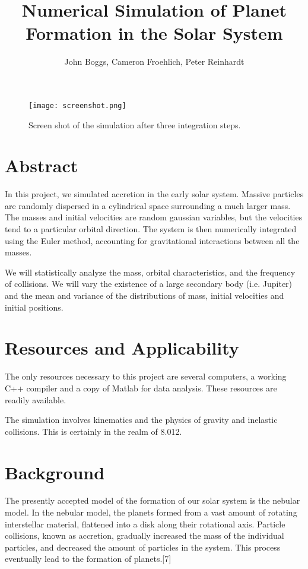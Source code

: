 \documentclass{article}
\begin{document}
\title{Numerical Simulation of Planet Formation in the Solar System}
\author{John Boggs, Cameron Froehlich, Peter Reinhardt}
\maketitle

\begin{figure} 
 \begin{center}
 \texttt{[image: screenshot.png]} 
 \caption{Screen shot of the simulation after three integration steps.} 
 \end{center}
\end{figure}

\section{Abstract}
In this project, we simulated accretion in the early solar system. Massive particles are randomly dispersed in a cylindrical space surrounding a much larger mass. The masses and initial velocities are random gaussian variables, but the velocities tend to a particular orbital direction. The system is then numerically integrated using the Euler method, accounting for gravitational interactions between all the masses.

We will statistically analyze the mass, orbital characteristics, and the frequency of collisions. We will vary the existence of a large secondary body (i.e. Jupiter) and the mean and variance of the distributions of mass, initial velocities and initial positions.

\section{Resources and Applicability}
The only resources necessary to this project are several computers, a working C++ compiler and a copy of Matlab for data analysis. These resources are readily available.

The simulation involves kinematics and the physics of gravity and inelastic collisions. This is certainly in the realm of 8.012.

\section{Background}
The presently accepted model of the formation of our solar system is the nebular model. In the nebular model, the planets formed from a vast amount of rotating interstellar material, flattened into a disk along their rotational axis. Particle collisions, known as accretion, gradually increased the mass of the individual particles, and decreased the amount of particles in the system. This process eventually lead to the formation of planets.[7]
\end{document}
